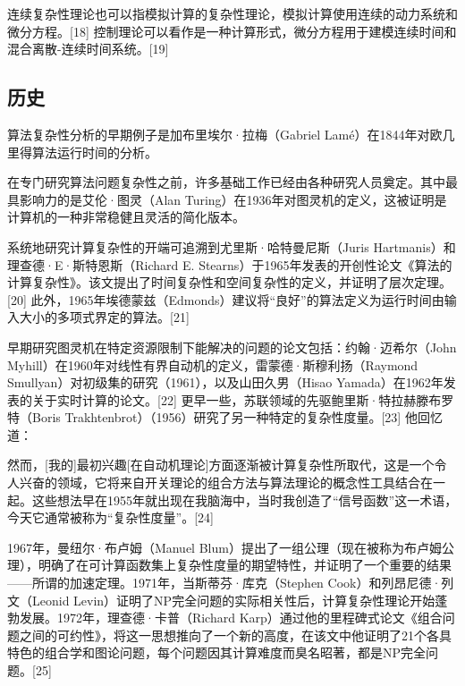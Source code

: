 连续复杂性理论也可以指模拟计算的复杂性理论，模拟计算使用连续的动力系统和微分方程。[18] 控制理论可以看作是一种计算形式，微分方程用于建模连续时间和混合离散-连续时间系统。[19]
\subsection{历史}
算法复杂性分析的早期例子是加布里埃尔·拉梅（Gabriel Lamé）在1844年对欧几里得算法运行时间的分析。

在专门研究算法问题复杂性之前，许多基础工作已经由各种研究人员奠定。其中最具影响力的是艾伦·图灵（Alan Turing）在1936年对图灵机的定义，这被证明是计算机的一种非常稳健且灵活的简化版本。

系统地研究计算复杂性的开端可追溯到尤里斯·哈特曼尼斯（Juris Hartmanis）和理查德·E·斯特恩斯（Richard E. Stearns）于1965年发表的开创性论文《算法的计算复杂性》。该文提出了时间复杂性和空间复杂性的定义，并证明了层次定理。[20] 此外，1965年埃德蒙兹（Edmonds）建议将“良好”的算法定义为运行时间由输入大小的多项式界定的算法。[21]

早期研究图灵机在特定资源限制下能解决的问题的论文包括：约翰·迈希尔（John Myhill）在1960年对线性有界自动机的定义，雷蒙德·斯穆利扬（Raymond Smullyan）对初级集的研究（1961），以及山田久男（Hisao Yamada）在1962年发表的关于实时计算的论文。[22] 更早一些，苏联领域的先驱鲍里斯·特拉赫滕布罗特（Boris Trakhtenbrot）（1956）研究了另一种特定的复杂性度量。[23] 他回忆道：

然而，[我的]最初兴趣[在自动机理论]方面逐渐被计算复杂性所取代，这是一个令人兴奋的领域，它将来自开关理论的组合方法与算法理论的概念性工具结合在一起。这些想法早在1955年就出现在我脑海中，当时我创造了“信号函数”这一术语，今天它通常被称为“复杂性度量”。[24]

1967年，曼纽尔·布卢姆（Manuel Blum）提出了一组公理（现在被称为布卢姆公理），明确了在可计算函数集上复杂性度量的期望特性，并证明了一个重要的结果——所谓的加速定理。1971年，当斯蒂芬·库克（Stephen Cook）和列昂尼德·列文（Leonid Levin）证明了NP完全问题的实际相关性后，计算复杂性理论开始蓬勃发展。1972年，理查德·卡普（Richard Karp）通过他的里程碑式论文《组合问题之间的可约性》，将这一思想推向了一个新的高度，在该文中他证明了21个各具特色的组合学和图论问题，每个问题因其计算难度而臭名昭著，都是NP完全问题。[25]
